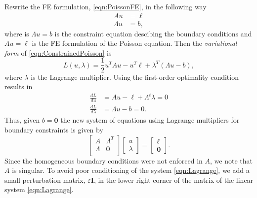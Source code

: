 Rewrite the FE formulation, \eqref{eqn:PoissonFE}, in the following way
\begin{equation}
  \begin{split}
    A u &= \ell \\
    \Lambda u &= b,
  \end{split}
  \label{eqn:ConstrainedPoisson}
\end{equation}
where is $\Lambda u = b$ is the constraint equation descibing the boundary
conditions and $A u = \ell$ is the FE formulation of the Poisson equation.
Then the \emph{variational form} of \eqref{eqn:ConstrainedPoisson} is
\begin{equation}
  L(u,\lambda) = \frac{1}{2}u^T A u - u^T \ell + \lambda^T (\Lambda u - b),
  \label{eqn:Variational}
\end{equation}
where $\lambda$ is the Lagrange multiplier. Using the first-order optimality
condition results in
\begin{equation}
  \begin{split}
    \frac{d L}{du} &= Au - \ell + \Lambda^t \lambda = 0 \\
    \frac{d L}{d\lambda} &= \Lambda u - b = 0.
  \end{split}
  \label{eqn:Condition}
\end{equation}
Thus, given $b = \mathbf{0}$ the new system of equations using Lagrange
multipliers for boundary constraints is given by
\begin{equation}
  \begin{bmatrix}
    A & \Lambda^T \\
    \Lambda &  \mathbf{0} \\
  \end{bmatrix} \begin{bmatrix}
    u \\ \lambda
  \end{bmatrix} = \begin{bmatrix}
    \ell \\ \mathbf{0}
  \end{bmatrix}.
  \label{eqn:Lagrange}
\end{equation}
Since the homogeneous boundary conditions were not enforced in $A$, we note that
$A$ is singular.  To avoid poor conditioning of the system \eqref{eqn:Lagrange},
we add a small perturbation matrix, $\varepsilon \mathbf{I}$, in the lower right
corner of the matrix of the linear system \eqref{eqn:Lagrange}.
